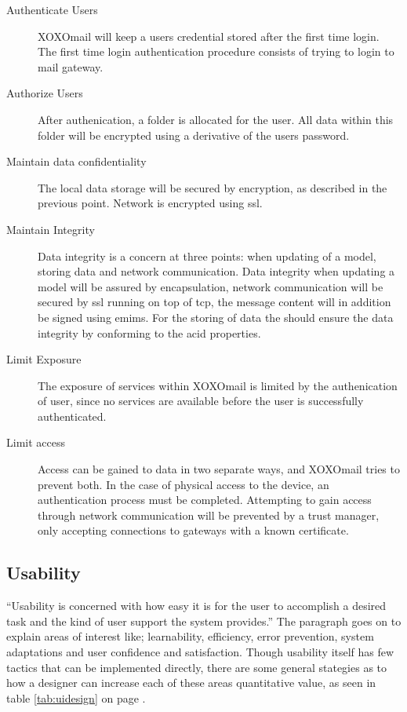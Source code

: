 		\begin{description}
			\item[Authenticate Users] XOXOmail will keep a users credential stored after the first time login. The first time login authentication procedure consists of trying to login to mail gateway.
			\item[Authorize Users] After authenication, a folder is allocated for the user. All data within this folder will be encrypted using a derivative of the users password. 
			\item[Maintain data confidentiality] The local data storage will be secured by encryption, as described in the previous point. Network is encrypted using \gls{ssl}. 
			\item[Maintain Integrity] Data integrity is a concern at three points: when updating of a model, storing data and network communication. Data integrity when updating a model will be assured by encapsulation, network communication will be secured by \gls{ssl} running on top of \gls{tcp}, the message content will in addition be signed using \gls{emims}. For the storing of data the  should ensure the data integrity by conforming to the \gls{acid} properties.
			\item[Limit Exposure] The exposure of services within XOXOmail is limited by the authenication of user, since no services are available before the user is successfully authenticated.
			\item[Limit access] Access can be gained to data in two separate ways, and XOXOmail tries to prevent both. In the case of physical access to the device, an authentication process must be completed. Attempting to gain access through network communication will be prevented by a trust manager, only accepting connections to gateways with a known certificate. 
		\end{description}
		
\newpage

	\subsection{Usability}
		``Usability is concerned with how easy it is for the user to accomplish a desired task and the kind of user support the system provides.''\cite[p. 90]{bib:archi} The paragraph goes on to explain areas of interest like; learnability, efficiency, error prevention, system adaptations and user confidence and satisfaction. Though usability itself has few tactics that can be implemented directly, there are some general stategies as to how a designer can increase each of these areas quantitative value, as seen in table \ref{tab:uidesign} on page \pageref{tab:uidesign}. 
		
